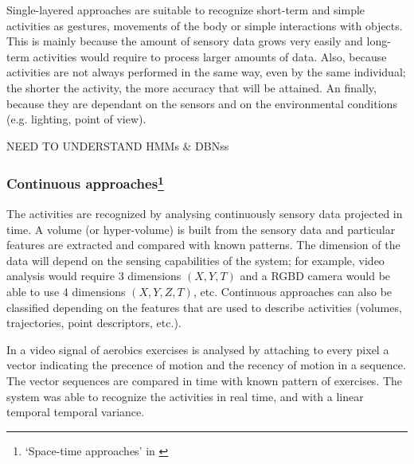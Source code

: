 \documentclass[a4paper, 12pt, openany, oneside]{book}
\begin{document}

Single-layered approaches are suitable to recognize short-term and simple activities as gestures, movements of the body or simple interactions with objects. 
This is mainly because the amount of sensory data grows very easily and long-term activities would require to process larger amounts of data. 
Also, because activities are not always performed in the same way, even by the same individual; the shorter the activity, the more accuracy that will be attained.
An finally, because they are dependant on the sensors and on the environmental conditions (e.g. lighting, point of view).



NEED TO UNDERSTAND HMMs & DBNss


\subsubsection{Continuous approaches\footnote{`Space-time approaches' in \citep{Aggarwal11_HumanActivity}}} %

The activities are recognized by analysing continuously sensory data projected in time. 
A volume (or hyper-volume) is built from the sensory data and particular features are extracted and compared with known patterns.
The dimension of the data will depend on the sensing capabilities of the system; for example, video analysis would require 3 dimensions $(X,Y,T)$ and a RGBD camera would be able to use 4 dimensions $(X,Y,Z,T)$, etc. %
Continuous approaches can also be classified depending on the features that are used to describe activities (volumes, trajectories, point descriptors, etc.).

In \citep{Bobick2001_RecHuMovTemp} a video signal of aerobics exercises is analysed by attaching to every pixel a vector indicating the precence of motion and the recency of motion in a sequence. 
The vector sequences are compared in time with known pattern of exercises. 
The system was able to recognize the activities in real time, and with a linear temporal temporal variance. 
\end{document}
